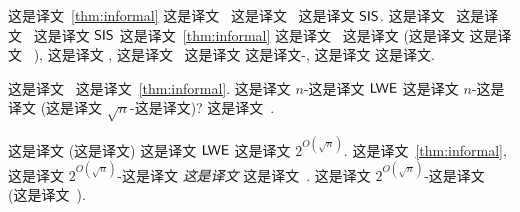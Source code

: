 
 这是译文~\ref{thm:informal} 这是译文~\cite{DBLP:conf/stoc/Peikert09} 这是译文~\cite{DBLP:journals/jacm/Regev09} 这是译文 $\mathsf{SIS}$.  这是译文~\cite{DBLP:conf/stoc/Peikert09} 这是译文~\cite{DBLP:journals/jacm/Regev09} 这是译文 $\mathsf{SIS}$ 这是译文~\ref{thm:informal}  这是译文~\cite{DBLP:conf/stoc/Peikert09} 这是译文 \gapsvp (这是译文 \bdd 这是译文 \usvp~\cite{DBLP:conf/crypto/LyubashevskyM09}), 这是译文 \sivp, 这是译文~\cite{DBLP:journals/jacm/Regev09} 这是译文 \sis 这是译文-\lwe, 这是译文 \gapsvp 这是译文. 

这是译文~\cite{DBLP:conf/stoc/Peikert09} 这是译文~\ref{thm:informal}. 这是译文 $n$-这是译文 $\mathsf{LWE}$ 这是译文 $n$-这是译文 (这是译文 $\sqrt{n}$-这是译文)? 这是译文~\cite{DBLP:journals/jacm/Regev09}.

这是译文 (这是译文) 这是译文 $\mathsf{LWE}$ 这是译文 $2^{O(\sqrt{n})}$. 这是译文~\ref{thm:informal}, 这是译文 $2^{O(\sqrt{n})}$-这是译文 \emph{这是译文} 这是译文~\cite{DBLP:journals/jacm/Regev09}. 这是译文 $2^{O(\sqrt{n})}$-这是译文~\cite{DBLP:journals/siamcomp/Kuperberg05} (这是译文~\cite{DBLP:journals/siamcomp/Regev04}).




